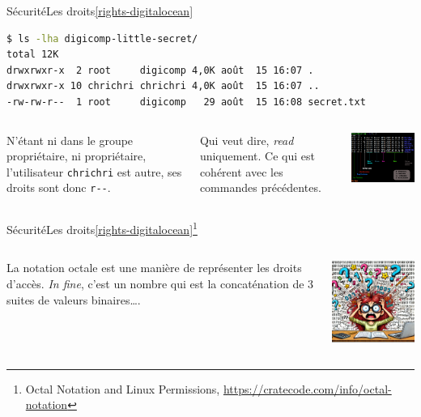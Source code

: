 \documentclass{beamer}
\begin{document}
    \begin{frame}[fragile]{Sécurité}{Les droits\cref{rights-digitalocean}}
        \begin{lstlisting}[language=bash]
$ ls -lha digicomp-little-secret/
total 12K
drwxrwxr-x  2 root     digicomp 4,0K août  15 16:07 .
drwxrwxr-x 10 chrichri chrichri 4,0K août  15 16:07 ..
-rw-rw-r--  1 root     digicomp   29 août  15 16:08 secret.txt
        \end{lstlisting}
        \begin{columns}
            N'étant ni dans le groupe propriétaire, ni propriétaire, l'utilisateur \lstinline{chrichri} est autre, ses droits sont donc \lstinline{r--}.

            Qui veut dire, \textit{read} uniquement.
            Ce qui est cohérent avec les commandes précédentes.
            \begin{center}
                \includegraphics[width=6.5cm]{image/ls-details}
            \end{center}
        \end{columns}
    \end{frame}

    \begin{frame}{Sécurité}{Les droits\cref{rights-digitalocean}\footnotestep\footnote{\label{octal}Octal Notation and Linux Permissions, \url{https://cratecode.com/info/octal-notation}}}
        \begin{columns}
            La notation octale est une manière de représenter les droits d'accès.
            \bigbreak
            \textit{In fine}, c'est un nombre qui est la concaténation de 3 suites de valeurs binaires\ldots.
            \begin{center}
                \includegraphics[width=6.5cm]{image/binary-explosion}
            \end{center}
        \end{columns}
    \end{frame}
\end{document}
